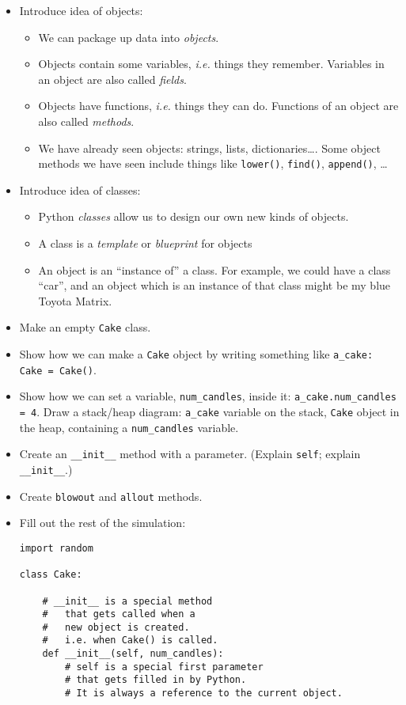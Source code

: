 \documentclass{article}
\begin{document}
\begin{itemize}
\item Introduce idea of objects:
  \begin{itemize}
  \item We can package up data into \emph{objects}.
  \item Objects contain some variables, \emph{i.e.} things they
    remember.  Variables in an object are also called \emph{fields}.
  \item Objects have functions, \emph{i.e.} things they can
    do. Functions of an object are also called \emph{methods}.
  \item We have already seen objects: strings, lists,
    dictionaries\dots.  Some object methods we have seen include
    things like \verb|lower()|, \verb|find()|, \verb|append()|, \dots
  \end{itemize}
\item Introduce idea of classes:
  \begin{itemize}
  \item Python \emph{classes} allow us to design our own new kinds of
    objects.
  \item A class is a \emph{template} or \emph{blueprint} for objects
  \item An object is an ``instance of'' a class.  For example,
    we could have a class ``car'', and an object which is an instance
    of that class might be my blue Toyota Matrix.
  \end{itemize}
\item Make an empty \verb|Cake| class.
\item Show how we can make a \verb|Cake| object by writing something
  like \verb|a_cake: Cake = Cake()|.
\item Show how we can set a variable, \verb|num_candles|, inside it:
  \verb|a_cake.num_candles = 4|. Draw a stack/heap diagram:
  \verb|a_cake| variable on the stack, \verb|Cake| object in the heap,
  containing a \verb|num_candles| variable.
\item Create an \verb|__init__| method with a parameter. (Explain
  \verb|self|; explain \verb|__init__|.)
\item Create \verb|blowout| and \verb|allout| methods.
\item Fill out the rest of the simulation:
\begin{verbatim}
import random

class Cake:

    # __init__ is a special method
    #   that gets called when a
    #   new object is created.
    #   i.e. when Cake() is called.
    def __init__(self, num_candles):
        # self is a special first parameter
        # that gets filled in by Python.
        # It is always a reference to the current object.


\end{verbatim}
\end{itemize}
\end{document}
